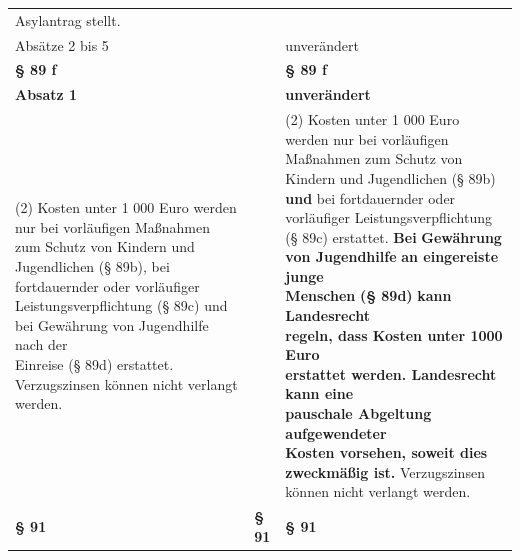 \documentclass[10pt,a4paper,landscape]{article}
\begin{document}
\begin{longtable}{|L{8.2cm}|L{8.2cm}|L{8.2cm}|}
Asylantrag stellt. \\
\hhline{|---|}
Absätze 2 bis 5 &  & unverändert \\
\hhline{|---|}
\textbf{\S{} 89 f} &  & \textbf{\S{} 89 f} \\
\hhline{|---|}
\textbf{Absatz 1} &  & \textbf{unverändert} \\
\hhline{|---|}
(2) Kosten unter 1 000 Euro werden nur bei  \newline vorläufigen Maßnahmen zum Schutz von  \newline Kindern und Jugendlichen (\S{} \textcolor{diffred}{89b),} bei  \newline fortdauernder oder vorläufiger  \newline Leistungsverpflichtung (\S{} 89c) \textcolor{diffred}{und bei}  \newline Gewährung von Jugendhilfe \textcolor{diffred}{nach der  \newline Einreise} (\S{} 89d) \textcolor{diffred}{erstattet.} Verzugszinsen  \newline können nicht verlangt werden. &  & (2) Kosten unter 1 000 Euro werden nur bei  \newline vorläufigen Maßnahmen zum Schutz von  \newline Kindern und Jugendlichen (\S{} \textcolor{diffgreen}{89b) }\textbf{\textcolor{diffgreen}{und}} bei  \newline fortdauernder oder vorläufiger  \newline Leistungsverpflichtung (\S{} 89c) \textcolor{diffgreen}{erstattet. }\textbf{\textcolor{diffgreen}{Bei}}\textbf{ Gewährung  \newline von Jugendhilfe }\textbf{\textcolor{diffgreen}{an eingereiste junge  \newline Menschen}}\textbf{ (\S{} 89d) }\textbf{\textcolor{diffgreen}{kann Landesrecht  \newline regeln, dass Kosten unter 1000 Euro  \newline erstattet werden. Landesrecht kann eine  \newline pauschale Abgeltung aufgewendeter  \newline Kosten vorsehen, soweit dies  \newline zweckmäßig ist.}} Verzugszinsen können  \newline nicht verlangt werden. \\
\hhline{|---|}
\textbf{\S{} 91} & \textbf{\S{} 91} & \textbf{\S{} 91} \\

\end{longtable}
\end{document}
